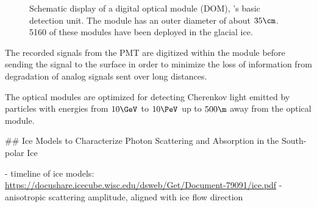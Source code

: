 \begin{figure}[htbp]
  \hfill
  \caption{Schematic display of a digital optical module (DOM), \icecube's basic detection unit. The module has an outer diameter of about $35\cm$. 5160 of these modules have been deployed in the glacial ice.}
  \label{fig:aK4raigh}
\end{figure}


The recorded signals from the PMT are digitized within the module before sending the signal to the surface in order to minimize the loss of information from degradation of analog signals sent over long distances. \cite{firstyearperformance}

The optical modules are optimized for detecting Cherenkov light emitted by particles with energies from $10\GeV$ to $10\PeV$ up to $500\m$ away from the optical module. \cite{instrumentation}


## Ice Models to Characterize Photon Scattering and Absorption in the South-polar Ice

- timeline of ice models: \url{https://docushare.icecube.wisc.edu/dsweb/Get/Document-79091/ice.pdf} \cite{flasherdataderivedicemodels}
- anisotropic scattering amplitude, aligned with ice flow direction \cite{icrc17pocam}

